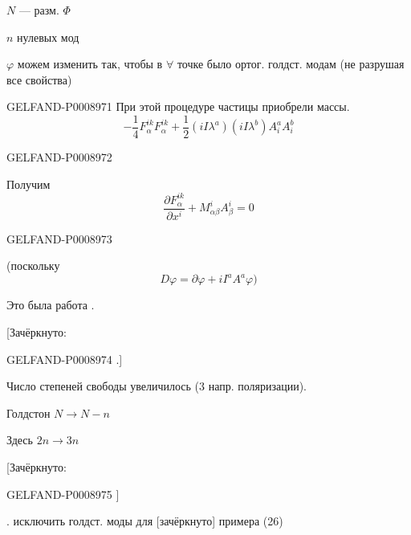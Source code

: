 $N$ — разм. $\Phi$

$n$ нулевых мод

$\varphi$ можем изменить так, чтобы в $\forall$ точке было ортог. голдст. модам (не разрушая все свойства)


\begin{GelfandAdjacentEvidence}{GELFAND-P000897}{1}
При этой процедуре частицы приобрели массы.
\begin{equation*}
-\frac14F_\alpha^{ik}F_\alpha^{ik}
+\frac12(iI\lambda^a)(iI\lambda^b)A_i^aA_i^b
\tag{28}
\end{equation*}
\end{GelfandAdjacentEvidence}
\begin{GelfandAdjacentEvidence}{GELFAND-P000897}{2}


Получим
\begin{equation*}
\frac{\partial F_\alpha^{ik}}{\partial x^i}
+M_{\alpha\beta}^i A_\beta^i=0 \tag{29}
\end{equation*}
\end{GelfandAdjacentEvidence}
\begin{GelfandAdjacentEvidence}{GELFAND-P000897}{3}


(поскольку
\begin{equation*}
D\varphi=\partial\varphi+iI^aA^a\varphi) \tag{30}
\end{equation*}

Это была работа .

[Зачёркнуто: 
\end{GelfandAdjacentEvidence}
\begin{GelfandAdjacentEvidence}{GELFAND-P000897}{4}
.]

Число степеней свободы увеличилось 
(3 напр. поляризации).

Голдстон $N\to N-n$

Здесь $2n\to3n$

[Зачёркнуто: 
\end{GelfandAdjacentEvidence}
\begin{GelfandAdjacentEvidence}{GELFAND-P000897}{5}
]

. исключить голдст. моды для [зачёркнуто] примера (26)
\end{GelfandAdjacentEvidence}
